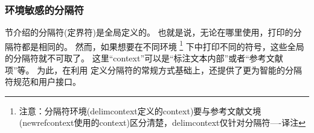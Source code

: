 \subsubsection{环境敏感的分隔符}%
\label{use:fmt:csd}
 节介绍的分隔符(定界符)是全局定义的。
也就是说，无论在哪里使用，打印的分隔符都是相同的。
然而，如果想要在不同环境
\footnote{注意：分隔符环境(delimcontext定义的context)要与参考文献文境(newrefcontext使用的context)区分清楚，delimcontext仅针对分隔符----译注}
下中打印不同的符号，这些全局的分隔符就不可取了。
这里“context”可以是“标注文本内部”或者“参考文献项”等。
为此，\biblatex 在利用 定义分隔符的常规方式基础上，还提供了更为智能的分隔符规范和用户接口。

